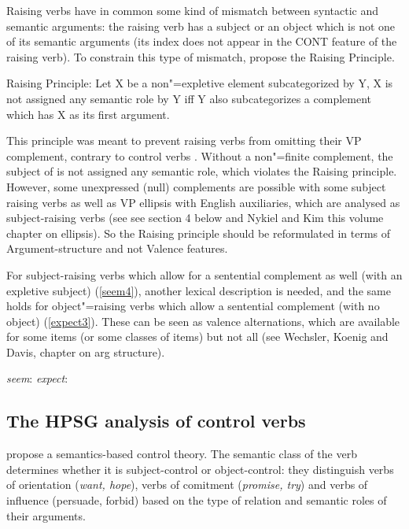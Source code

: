 \documentclass[output=paper
	        ,collection
	        ,collectionchapter
 	        ,biblatex
                ,babelshorthands
                ,newtxmath
                ,draftmode
                ,colorlinks, citecolor=brown
]{langscibook}
\begin{document}
Raising verbs have in common some kind of mismatch between syntactic and
semantic arguments: the raising verb has a subject or an object which is not one of its semantic
arguments (its index does not appear in the CONT feature of the raising verb). To constrain this type of
mismatch, \citet[140]{PollardandSag1994} propose the Raising Principle.

\begin{exe}
\ex Raising Principle: Let X be a non"=expletive element subcategorized by Y, X is not assigned any semantic role by Y iff Y also subcategorizes a complement which has X as its first argument.
\end{exe}

This principle was meant to prevent raising verbs from omitting their VP complement, contrary to control verbs \citep{Jacobson1990}. Without a non"=finite complement, the subject of  is not assigned any semantic role, which violates the Raising principle. However, some unexpressed (null) complements are possible with some subject raising verbs 
as well as VP ellipsis with English auxiliaries, which are analysed as subject-raising verbs (see see section 4 below and Nykiel and Kim this volume chapter on ellipsis). So the Raising principle should be reformulated in terms of Argument-structure and not Valence features.

\eal
{}
\zl

For subject-raising verbs which allow for a sentential complement as well (with an expletive subject) (\ref{seem4}), another lexical description is needed, and the same holds for object"=raising verbs which allow a sentential complement (with no object) (\ref{expect3}). These can be seen as valence alternations, which are available for some items (or some classes of items) but not all (see Wechsler, Koenig and Davis, chapter on arg structure).

\eal
\ex \emph{seem}:   \argst {}
\ex \emph{expect}: \argst {}
\zl

\subsection{The HPSG analysis of control verbs}

\citet{SagandPollard1991} propose a semantics-based control theory. The semantic class of the verb determines whether it is subject-control or object-control: they distinguish verbs of orientation (\emph{want, hope}), verbs of comitment (\emph{promise, try}) and verbs of influence (persuade, forbid) based on the type of relation and semantic roles of their arguments. 
\end{document}
